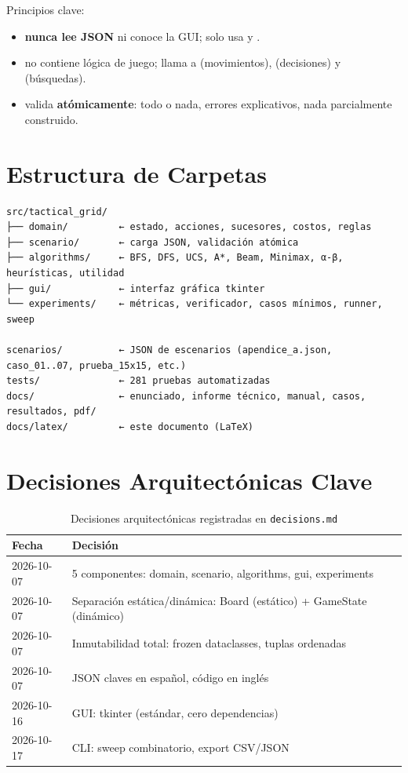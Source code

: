 Principios clave:
\begin{itemize}
\item {} \textbf{nunca lee JSON} ni conoce la GUI; solo usa  y .
\item {} no contiene lógica de juego; llama a  (movimientos),  (decisiones) y  (búsquedas).
\item {} valida \textbf{atómicamente}: todo o nada, errores explicativos, nada parcialmente construido.
\end{itemize}

\section{Estructura de Carpetas}
\label{sec:estructura-carpetas}

\begin{verbatim}
src/tactical_grid/
├── domain/         ← estado, acciones, sucesores, costos, reglas
├── scenario/       ← carga JSON, validación atómica
├── algorithms/     ← BFS, DFS, UCS, A*, Beam, Minimax, α-β, heurísticas, utilidad
├── gui/            ← interfaz gráfica tkinter
└── experiments/    ← métricas, verificador, casos mínimos, runner, sweep

scenarios/          ← JSON de escenarios (apendice_a.json, caso_01..07, prueba_15x15, etc.)
tests/              ← 281 pruebas automatizadas
docs/               ← enunciado, informe técnico, manual, casos, resultados, pdf/
docs/latex/         ← este documento (LaTeX)
\end{verbatim}

\section{Decisiones Arquitectónicas Clave}
\label{sec:decisiones-arquitectonicas}

\begin{table}[H]
\centering
\caption{Decisiones arquitectónicas registradas en \texttt{decisions.md}}
\begin{tabular}{ll}
\toprule
\textbf{Fecha} & \textbf{Decisión} \\
\midrule
2026-10-07 & 5 componentes: domain, scenario, algorithms, gui, experiments \\
2026-10-07 & Separación estática/dinámica: Board (estático) + GameState (dinámico) \\
2026-10-07 & Inmutabilidad total: frozen dataclasses, tuplas ordenadas \\
2026-10-07 & JSON claves en español, código en inglés \\
2026-10-16 & GUI: tkinter (estándar, cero dependencias) \\
2026-10-17 & CLI: sweep combinatorio, export CSV/JSON \\
\bottomrule
\end{tabular}
\label{tab:decisiones-arq}
\end{table}
